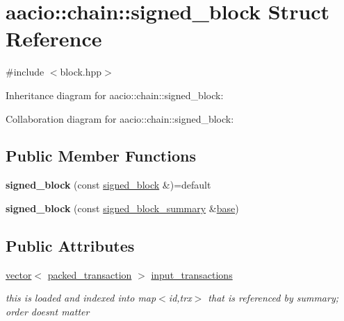 \hypertarget{structaacio_1_1chain_1_1signed__block}{}\section{aacio\+:\+:chain\+:\+:signed\+\_\+block Struct Reference}
\label{structaacio_1_1chain_1_1signed__block}


{\ttfamily \#include $<$block.\+hpp$>$}



Inheritance diagram for aacio\+:\+:chain\+:\+:signed\+\_\+block\+:


Collaboration diagram for aacio\+:\+:chain\+:\+:signed\+\_\+block\+:
\subsection*{Public Member Functions}
\begin{DoxyCompactItemize}
\item 
\mbox{\label{structaacio_1_1chain_1_1signed__block_a3c2fee495b7551b3a249785919bad1cc}} 
{\bfseries signed\+\_\+block} (const \mbox{\hyperlink{structaacio_1_1chain_1_1signed__block}{signed\+\_\+block}} \&)=default
\item 
\mbox{\label{structaacio_1_1chain_1_1signed__block_adc460f08c1f0f6c4e825808180993a76}} 
{\bfseries signed\+\_\+block} (const \mbox{\hyperlink{structaacio_1_1chain_1_1signed__block__summary}{signed\+\_\+block\+\_\+summary}} \&\mbox{\hyperlink{structbase}{base}})
\end{DoxyCompactItemize}
\subsection*{Public Attributes}
\begin{DoxyCompactItemize}
\item 
\mbox{\label{structaacio_1_1chain_1_1signed__block_a636b296682fdd040e360ac52959b143e}} 
\mbox{\hyperlink{classstd_1_1vector}{vector}}$<$ \mbox{\hyperlink{structaacio_1_1chain_1_1packed__transaction}{packed\+\_\+transaction}} $>$ \mbox{\hyperlink{structaacio_1_1chain_1_1signed__block_a636b296682fdd040e360ac52959b143e}{input\+\_\+transactions}}
\begin{DoxyCompactList}\small\item\em this is loaded and indexed into map$<$id,trx$>$ that is referenced by summary; order doesn\textquotesingle{}t matter \end{DoxyCompactList}\end{DoxyCompactItemize}
